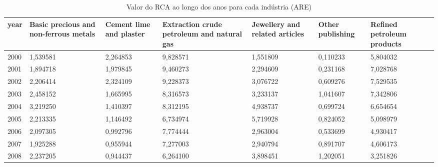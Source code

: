 \begin{table}
\centering
\caption{Valor do RCA ao longo dos anos para cada indústria (ARE)}
\begin{tabular}{p{1cm}p{2cm}p{2cm}p{2cm}p{2cm}p{2cm}p{2cm}}
\toprule
 year &  Basic precious and non-ferrous metals &  Cement lime and plaster &  Extraction crude petroleum and natural gas &  Jewellery and related articles &  Other publishing &  Refined petroleum products \\
\midrule
 2000 &                               1,539581 &                 2,264853 &                                    9,828571 &                        1,551809 &          0,110233 &                    5,804032 \\
 2001 &                               1,894718 &                 1,979845 &                                    9,460273 &                        2,294609 &          0,231168 &                    7,028768 \\
 2002 &                               2,206414 &                 2,324109 &                                    9,228373 &                        3,076722 &          0,609276 &                    7,529535 \\
 2003 &                               2,458152 &                 1,665995 &                                    8,316573 &                        3,233137 &          1,041607 &                    7,342806 \\
 2004 &                               3,219250 &                 1,410397 &                                    8,312195 &                        4,938737 &          0,699724 &                    6,654654 \\
 2005 &                               2,213335 &                 1,146492 &                                    6,734974 &                        5,719928 &          0,824052 &                    5,098979 \\
 2006 &                               2,097305 &                 0,992796 &                                    7,774444 &                        2,963004 &          0,533699 &                    4,930417 \\
 2007 &                               1,925288 &                 0,955944 &                                    7,277003 &                        2,940794 &          0,891707 &                    4,606173 \\
 2008 &                               2,237205 &                 0,944437 &                                    6,264100 &                        3,898451 &          1,202051 &                    3,251826 \\

\end{tabular}
\end{table}
